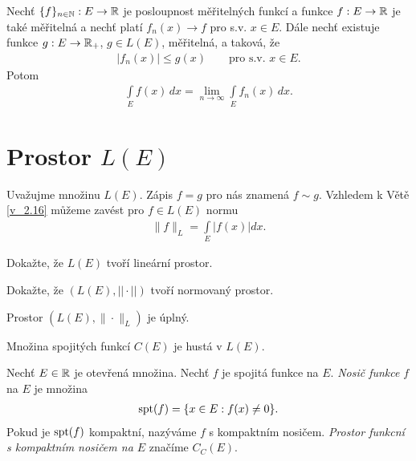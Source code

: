 \begin{theorem}
Nechť $\{f\}_{n \in \mathbb{N}}:E \to \mathbb{R}$ je posloupnost měřitelných funkcí a funkce $f:E \to \mathbb{R}$ je také měřitelná a nechť platí $f_n(x) \to f$ pro s.v. $x \in E$. Dále nechť existuje funkce $g:E \to \mathbb{R}_+$, $g \in L(E)$, měřitelná, a taková, že 
\begin{align*}
    |f_n(x)| \leq g(x) \qquad \text{pro s.v. $x \in E$.}
\end{align*}
Potom 
\begin{align*}
    \int \limits _E f(x) \, dx = \lim \limits _{n \to \infty}\int \limits _E f_n(x) \, dx.
\end{align*}
\end{theorem}


\section{Prostor \texorpdfstring{$L(E)$}{LE}}

Uvažujme množinu $L(E)$. Zápis $f=g$ pro nás znamená $f \sim g$. Vzhledem k Větě \ref{v_2.16} můžeme zavést pro $f \in L(E)$ normu
\begin{align*}
\| f \|_L = \int \limits_E |f(x)| dx.
\end{align*}


\begin{uloha}
Dokažte, že $L(E)$ tvoří lineární prostor.
\end{uloha}


\begin{uloha}
Dokažte, že $(L(E),|| \cdot ||)$ tvoří normovaný prostor.
\end{uloha}

\begin{theorem}
Prostor $(L(E),\| \cdot \|_L)$ je úplný.
\end{theorem} 


\begin{theorem}
Množina spojitých funkcí $C(E)$ je hustá v $L(E)$.
\end{theorem}

\begin{definition}
Nechť $E \in \mathbb{R}$ je otevřená množina. Nechť $f$ je spojitá funkce na $E$. \textit{Nosič funkce }$f$ na $E$ je množina
\begin{align*}
\operatorname{spt}(f)=\{x \in E:f(x) \neq 0\}.
\end{align*}
Pokud je $\operatorname{spt}(f)$ kompaktní, nazýváme $f$ s kompaktním nosičem. \textit{Prostor funkcní s kompaktním nosičem na $E$} značíme $C_C(E)$.
\end{definition}

